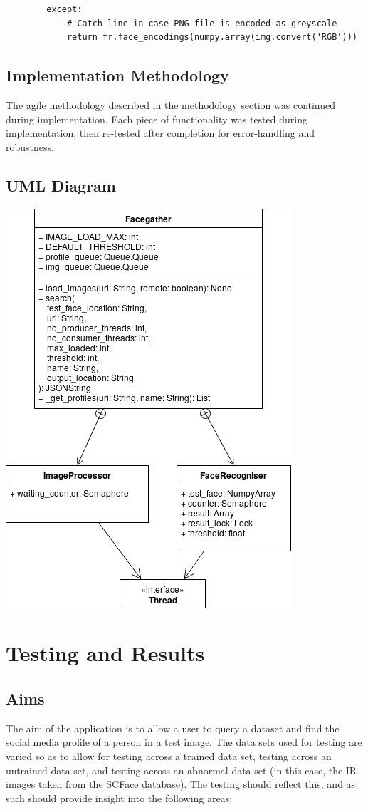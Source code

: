 \documentclass[12pt]{article}
\begin{document}
\begin{lstlisting}
        except:
            # Catch line in case PNG file is encoded as greyscale
            return fr.face_encodings(numpy.array(img.convert('RGB')))
\end{lstlisting}

\subsection{Implementation Methodology}
The agile methodology described in the methodology section was continued during implementation. Each piece of functionality was tested during implementation, then re-tested after completion for error-handling and robustness.

\subsection{UML Diagram}
\includegraphics[scale=1]{res/facegather_uml.png}

\section{Testing and Results}
\subsection{Aims}
The aim of the application is to allow a user to query a dataset and find the social media profile of a person in a test image. The data sets used for testing are varied so as to allow for testing across a trained data set, testing across an untrained data set, and testing across an abnormal data set (in this case, the IR images taken from the SCFace database). The testing should reflect this, and as such should provide insight into the following areas:
\end{document}
